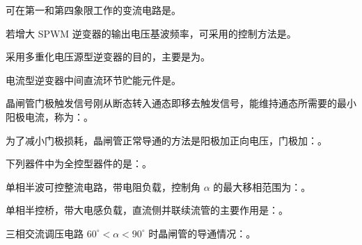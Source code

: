 \documentclass[电力电子]{subfiles}
\begin{document}
\begin{ti}
	可在第一和第四象限工作的变流电路是。
\end{ti}

\begin{ti}
	若增大 SPWM 逆变器的输出电压基波频率，可采用的控制方法是。
\end{ti}

\begin{ti}
	采用多重化电压源型逆变器的目的，主要是为。
\end{ti}

\begin{ti}
	电流型逆变器中间直流环节贮能元件是。
\end{ti}

\begin{ti}
	晶闸管门极触发信号刚从断态转入通态即移去触发信号，能维持通态所需要的最小阳极电流，称为：。
\end{ti}

\begin{ti}
	为了减小门极损耗，晶闸管正常导通的方法是阳极加正向电压，门极加：。
\end{ti}

\begin{ti}
	下列器件中为全控型器件的是：。
\end{ti}

\begin{ti}
	单相半波可控整流电路，带电阻负载，控制角 $\alpha$ 的最大移相范围为：。
\end{ti}

\begin{ti}
	单相半控桥，带大电感负载，直流侧并联续流管的主要作用是：。
\end{ti}

\begin{ti}
	三相交流调压电路 $60^\circ < \alpha < 90^\circ$ 时晶闸管的导通情况：。
\end{ti}
\end{document}
